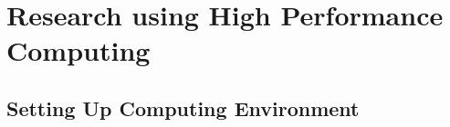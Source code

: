 \chapter{\label{Appendix_HPC}
Research using High Performance Computing}

\section{\label{A:Comp_Env}Setting Up Computing Environment}

% 
% 
% 
% 
% 

